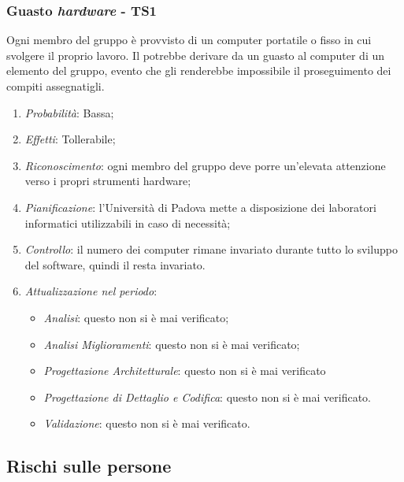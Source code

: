 \subsubsection{Guasto \textit{hardware} - TS1}
Ogni membro del gruppo \`e provvisto di un computer portatile o fisso in cui svolgere il proprio lavoro. Il  potrebbe derivare da un guasto al computer di un elemento del gruppo, evento che gli renderebbe impossibile il proseguimento dei compiti assegnatigli.
\begin{enumerate}
\item \textit{Probabilit\`a}: Bassa;
\item \textit{Effetti}: Tollerabile; 
\item \textit{Riconoscimento}: ogni membro del gruppo deve porre un’elevata attenzione verso i propri strumenti hardware;
\item \textit{Pianificazione}: l'Universit\`a di Padova mette a disposizione dei laboratori informatici utilizzabili
in caso di necessit\`a;
\item \textit{Controllo}: il numero dei computer rimane invariato durante tutto lo sviluppo del software, quindi il  resta invariato.
\item \textit{Attualizzazione nel periodo}: 
	\begin{itemize}
	\item \textit{Analisi}: questo  non si è mai verificato;
	\item \textit{Analisi Miglioramenti}: questo  non si è mai verificato;
	\item \textit{Progettazione Architetturale}: questo  non si è mai verificato
	\item \textit{Progettazione di Dettaglio e Codifica}: questo  non si è mai verificato.
	\item \textit{Validazione}: questo  non si è mai verificato.
	\end{itemize}
\end{enumerate}

\subsection{Rischi sulle persone}
